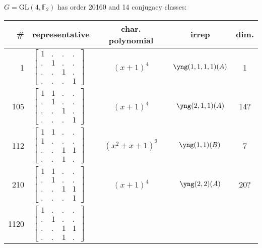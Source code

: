 \documentclass[11pt,oneside]{article}
\newcommand{\GL}{\mathrm{GL}}
\newcommand{\Field}{\mathbb{F}}
\newcommand{\tensor}{\otimes}
\begin{document}

$G=\GL(4,\Field_2)$ has order 20160 and 14 conjugacy classes:
\begin{center}
\begin{tabular}{r|l|c|c|c}
\# & representative & char. polynomial & irrep & dim. \\
\hline
1  & $\begin{bmatrix}1&.&.&.\\.&1&.&.\\.&.&1&.\\.&.&.&1\end{bmatrix}$  & $(x+1)^4$  & $\yng(1,1,1,1)(A)$ & 1  \\
105  & $\begin{bmatrix}1&1&.&.\\.&1&.&.\\.&.&1&.\\.&.&.&1\end{bmatrix}$  & $(x+1)^4$  & $\yng(2,1,1)(A)$ & 14?  \\
112  & $\begin{bmatrix}1&1&.&.\\1&.&.&.\\.&.&1&1\\.&.&1&.\end{bmatrix}$  & $(x^2+x+1)^2$  & $\yng(1,1)(B)$ & 7  \\
210  & $\begin{bmatrix}1&1&.&.\\.&1&.&.\\.&.&1&1\\.&.&.&1\end{bmatrix}$  & $(x+1)^4$  & $\yng(2,2)(A)$ & 20?  \\
1120  & $\begin{bmatrix}1&.&.&.\\.&1&.&.\\.&.&1&1\\.&.&1&.\end{bmatrix}$

\end{tabular}
\end{center}
\end{document}
